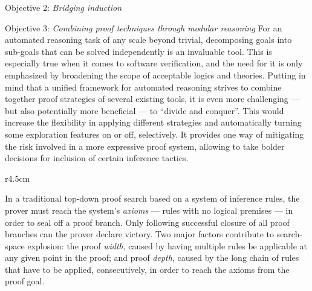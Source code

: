 \begin{paragraph}{Objective 2: {\it Bridging induction}}

\end{paragraph}


\begin{paragraph}{Objective 3: {\it Combining proof techniques through modular reasoning}}
For an automated reasoning task of any scale beyond trivial, decomposing goals into sub-goals that can be solved independently is an invaluable tool.
This is especially true when it comes to software verification, and the need for it is only emphasized by broadening the scope of acceptable logics and theories.
Putting in mind that a unified framework for automated reasoning strives to combine together proof strategies of several existing tools,
it is even more challenging --- but also potentially more beneficial --- to ``divide and conquer''.
This would increase the flexibility in applying different strategies and automatically turning some exploration features on or off, selectively.
It provides one way of mitigating the risk involved in a more expressive proof system, allowing to take bolder decisions for inclusion of certain inference tactics.

\begin{wrapfigure}[8]{r}{4.5cm}
\vspace{-1em}

\end{wrapfigure}

In a traditional top-down proof search based on a system of inference rules, the prover must reach the system's \emph{axioms} --- rules with no logical premises ---
in order to seal off a proof branch.
Only following successful closure of all proof branches can the prover declare victory.
Two major factors contribute to search-space explosion:
the proof \emph{width}, caused by having multiple rules be applicable at any given point in the proof;
and proof \emph{depth}, caused by the long chain of rules that have to be applied, consecutively, in order to reach the axioms from the proof goal.


\end{paragraph}
